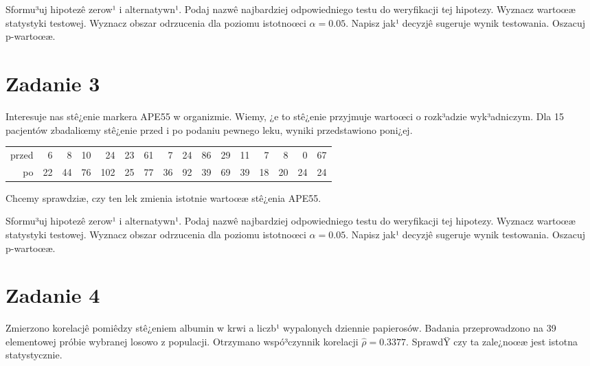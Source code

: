 \documentclass[a4paper,12pt]{article}
\begin{document}
  Sformu³uj hipotezê zerow¹ i alternatywn¹. 
  Podaj nazwê najbardziej odpowiedniego testu do weryfikacji tej hipotezy. 
  Wyznacz wartoœæ statystyki testowej. 
  Wyznacz obszar odrzucenia dla poziomu istotnoœci $\alpha=0.05$. 
  Napisz jak¹ decyzjê sugeruje wynik testowania. Oszacuj p-wartoœæ. \vspace{1cm} 

  \section*{Zadanie 3}
     
  Interesuje nas stê¿enie markera APE55  w organizmie. 
  Wiemy, ¿e to stê¿enie przyjmuje wartoœci o rozk³adzie wyk³adniczym. 
  Dla 15 pacjentów zbadaliœmy stê¿enie przed i po podaniu pewnego leku, 
  wyniki przedstawiono poni¿ej.
  
  \vspace{0.5cm} 
  \noindent\begin{center} 
\begin{tabular}{rrrrrrrrrrrrrrrr}
  \hline
  \hline
przed & 6 & 8 & 10 & 24 & 23 & 61 & 7 & 24 & 86 & 29 & 11 & 7 & 8 & 0 & 67 \\
  po & 22 & 44 & 76 & 102 & 25 & 77 & 36 & 92 & 39 & 69 & 39 & 18 & 20 & 24 & 24 \\
   \hline
\end{tabular}
 
  \end{center} 
  \vspace{0.5cm}
  
  Chcemy sprawdziæ, czy ten lek zmienia istotnie wartoœæ stê¿enia APE55.
  
  Sformu³uj hipotezê zerow¹ i alternatywn¹. 
  Podaj nazwê najbardziej odpowiedniego testu do weryfikacji tej hipotezy. 
  Wyznacz wartoœæ statystyki testowej. 
  Wyznacz obszar odrzucenia dla poziomu istotnoœci $\alpha=0.05$. 
  Napisz jak¹ decyzjê sugeruje wynik testowania. Oszacuj p-wartoœæ. \vspace{1cm} 

  \section*{Zadanie 4}
     
     Zmierzono korelacjê pomiêdzy stê¿eniem albumin w krwi a liczb¹ wypalonych dziennie papierosów. 
     Badania przeprowadzono na 39 elementowej próbie wybranej losowo z populacji. 
     Otrzymano wspó³czynnik korelacji $\hat\rho = 0.3377 $. 
     SprawdŸ czy ta zale¿noœæ jest istotna statystycznie. 
     
\end{document}
